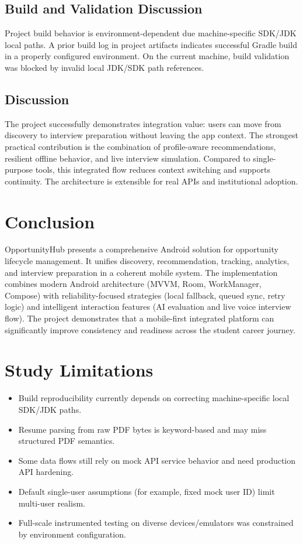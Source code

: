 \documentclass[conference]{IEEEtran}
\begin{document}
\subsection{Build and Validation Discussion}

Project build behavior is environment-dependent due machine-specific SDK/JDK local paths. A prior build log in project artifacts indicates successful Gradle build in a properly configured environment. On the current machine, build validation was blocked by invalid local JDK/SDK path references.

\subsection{Discussion}

The project successfully demonstrates integration value: users can move from discovery to interview preparation without leaving the app context. The strongest practical contribution is the combination of profile-aware recommendations, resilient offline behavior, and live interview simulation. Compared to single-purpose tools, this integrated flow reduces context switching and supports continuity. The architecture is extensible for real APIs and institutional adoption.

\section{Conclusion}

OpportunityHub presents a comprehensive Android solution for opportunity lifecycle management. It unifies discovery, recommendation, tracking, analytics, and interview preparation in a coherent mobile system. The implementation combines modern Android architecture (MVVM, Room, WorkManager, Compose) with reliability-focused strategies (local fallback, queued sync, retry logic) and intelligent interaction features (AI evaluation and live voice interview flow). The project demonstrates that a mobile-first integrated platform can significantly improve consistency and readiness across the student career journey.

\section{Study Limitations}

\begin{itemize}
  \item Build reproducibility currently depends on correcting machine-specific local SDK/JDK paths.
  \item Resume parsing from raw PDF bytes is keyword-based and may miss structured PDF semantics.
  \item Some data flows still rely on mock API service behavior and need production API hardening.
  \item Default single-user assumptions (for example, fixed mock user ID) limit multi-user realism.
  \item Full-scale instrumented testing on diverse devices/emulators was constrained by environment configuration.
\end{itemize}
\end{document}
